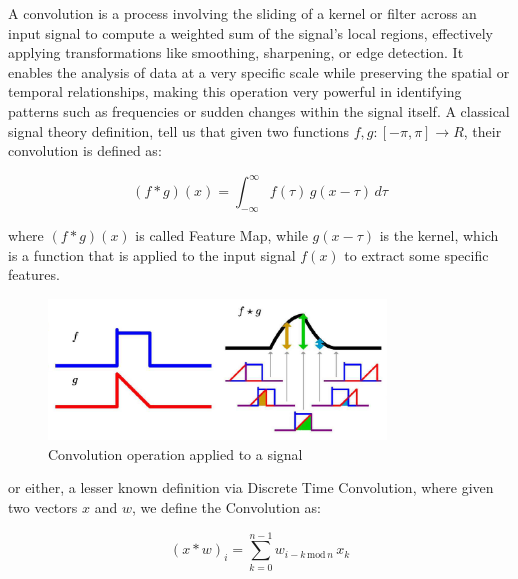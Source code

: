 A convolution is a process involving the sliding of a kernel or filter across an input signal to compute a weighted sum of the signal's local regions, effectively applying transformations like smoothing, sharpening, or edge detection. It enables the analysis of data at a very specific scale while preserving the spatial or temporal relationships, making this operation very powerful in identifying patterns such as frequencies or sudden changes within the signal itself.
A classical signal theory definition, tell us that given two functions $f, g : [-\pi, \pi] \rightarrow R$, their convolution is defined as:
\begin{center}
    \[
        (f * g)(x) = \int_{-\infty}^{\infty} f(\tau) \, g(x - \tau) \, d\tau
    \]
\end{center}
where $(f * g)(x)$ is called Feature Map, while $g(x - \tau)$ is the kernel, which is a function that is applied to the input signal $f(x)$ to extract some specific features.

\begin{figure}[ht]
    \centering
    \includegraphics[width=0.8\textwidth]{images/Convolution.jpg}
    \caption[Convolution operation applied on a signal]{Convolution operation applied to a signal}
    \label{fig:Convolution}
\end{figure}

or either, a lesser known definition via Discrete Time Convolution, where given two vectors $x$ and $w$, we define the Convolution as:

\begin{center}
    \[
        (x * w)_{i} = \sum_{k=0}^{n-1} w_{i-k \, \text{mod} \, n} \, x_k
    \]
\end{center}


